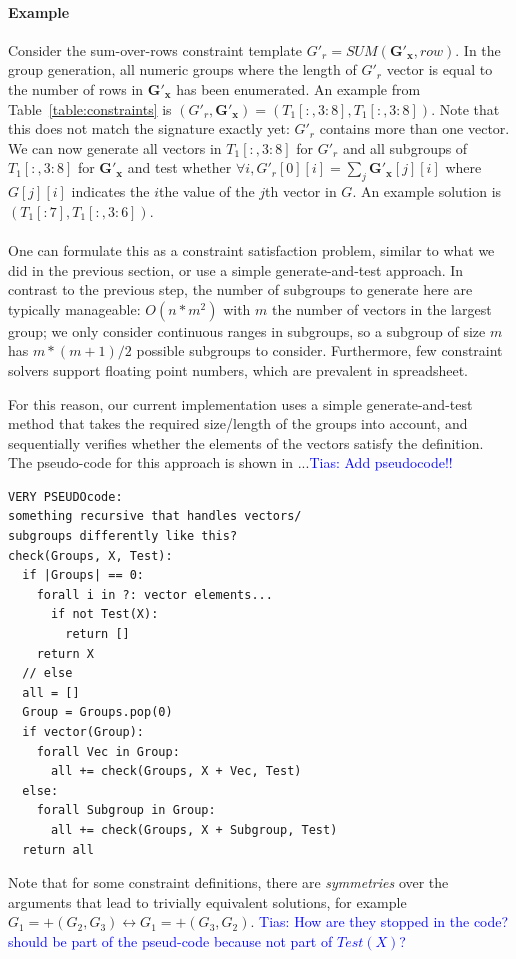 \documentclass{sig-alternate-05-2015}
\newcommand{\tias}[1]{\textcolor{blue}{{\sc Tias:} #1}\xspace}
\newcommand{\eccalc}[2]{\ensuremath{#1 = #2}}
\newcommand{\ecsumr}[2]{\eccalc{#1}{\textit{SUM}(#2, row)}}
\newcommand{\sg}{G'}
\begin{document}
\paragraph{Example}
Consider the sum-over-rows constraint template $\ecsumr{\sg_r}{\mathbf{\sg_x}}$. In the group generation, all numeric groups where the length of $\sg_r$ vector is equal to the number of rows in $\mathbf{\sg_x}$ has been enumerated. An example from Table~\ref{table:constraints} is $(\sg_r, \mathbf{\sg_x}) = (T_1[:,3:8],T_1[:,3:8])$. Note that this does not match the signature exactly yet: $\sg_r$ contains more than one vector. We can now generate all vectors in $T_1[:,3:8]$ for $\sg_r$ and all subgroups of $T_1[:,3:8]$ for $\mathbf{\sg_x}$ and test whether $\forall i, \sg_r[0][i] = \sum_j \mathbf{\sg_x}[j][i]$ where $G[j][i]$ indicates the $i$the value of the $j$th vector in $G$. An example solution is $(T_1[:7], T_1[:,3:6])$.
\\\\

One can formulate this as a constraint satisfaction problem, similar to what we did in the previous section, or use a simple generate-and-test approach. In contrast to the previous step, the number of subgroups to generate here are typically manageable: $O(n*m^2)$ with $m$ the number of vectors in the largest group; we only consider continuous ranges in subgroups, so a subgroup of size $m$ has $m*(m+1)/2$ possible subgroups to consider. Furthermore, few constraint solvers support floating point numbers, which are prevalent in spreadsheet.

For this reason, our current implementation uses a simple generate-and-test method that takes the required size/length of the groups into account, and sequentially verifies whether the elements of the vectors satisfy the definition. The pseudo-code for this approach is shown in ...\tias{Add pseudocode!!}

\begin{verbatim}
VERY PSEUDOcode:
something recursive that handles vectors/
subgroups differently like this?
check(Groups, X, Test):
  if |Groups| == 0:
    forall i in ?: vector elements...
      if not Test(X):
        return []
    return X
  // else
  all = []
  Group = Groups.pop(0)
  if vector(Group):
    forall Vec in Group:
      all += check(Groups, X + Vec, Test)
  else:
    forall Subgroup in Group:
      all += check(Groups, X + Subgroup, Test)
  return all
\end{verbatim}

Note that for some constraint definitions, there are \textit{symmetries} over the arguments that lead to trivially equivalent solutions, for example $G_1 = +(G_2, G_3) \leftrightarrow G_1 = +(G_3, G_2)$. \tias{How are they stopped in the code? should be part of the pseud-code because not part of $Test(X)$?}
\end{document}

